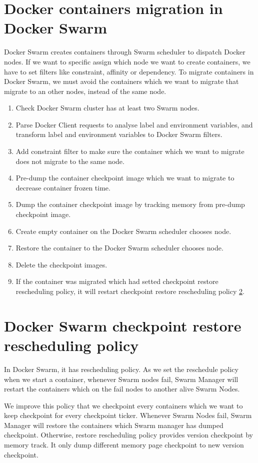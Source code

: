 \section{Docker containers migration in Docker Swarm}
Docker Swarm creates containers through Swarm scheduler to dispatch Docker nodes. If we want to specific assign which node we want to create containers, we have to set filters like constraint, affinity or dependency.
To migrate containers in Docker Swarm, we must avoid the containers which we want to migrate that migrate to an other nodes, instead of the same node.
\begin{enumerate}[Step 1.]
	\item Check Docker Swarm cluster has at least two Swarm nodes.
    \item Parse Docker Client requests to analyse label and environment variables, and transform label and environment variables to Docker Swarm filters.
    \item Add constraint filter to make sure the container which we want to migrate does not migrate to the same node.
    \item Pre-dump the container checkpoint image which we want to migrate to decrease container frozen time.
    \item Dump the container checkpoint image by tracking memory from pre-dump checkpoint image.
    \item Create empty container on the Docker Swarm scheduler chooses node.
    \item Restore the container to the Docker Swarm scheduler chooses node.
    \item Delete the checkpoint images.
    \item If the container was migrated which had setted checkpoint restore rescheduling policy, it will restart checkpoint restore rescheduling policy \ref{sec:checkpoint restore rescheduling policy}.
\end{enumerate}

\section{Docker Swarm checkpoint restore rescheduling policy}
\label{sec:checkpoint restore rescheduling policy}
In Docker Swarm, it has rescheduling policy. As we set the reschedule policy when we start a container, whenever Swarm nodes fail, Swarm Manager will restart the containers which on the fail nodes to another alive Swarm Nodes.

We improve this policy that we checkpoint every containers which we want to keep checkpoint for every checkpoint ticker. Whenever Swarm Nodes fail, Swarm Manager will restore the containers which Swarm manager has dumped checkpoint. Otherwise, restore rescheduling policy provides version checkpoint by memory track. It only dump different memory page checkpoint to new version checkpoint.

